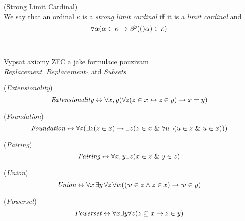 \begin{definition}{(Strong Limit Cardinal)}\label{def:limit_ordinal}\\
We say that an ordinal $\kappa$ is a \emph{strong limit cardinal} iff it is a \emph{limit cardinal} and 
\begin{equation}
\forall \alpha (\alpha \in \kappa \then \power(\alpha) \in \kappa)
\end{equation}
\end{definition}
\

Vypsat axiomy ZFC a jake formulace pouzivam\\
\emph{Replacement}, $Replacement_2$ atd
\emph{Subsets}

\begin{definition}{(\emph{Extensionality})}\label{def:extensionality}\\
\begin{equation}
\emph{Extensionality} \iff \forall x, y(\forall z (z \in x \iff z \in y) \then x = y)
\end{equation}
\end{definition}

\begin{definition}{(\emph{Foundation})}\label{def:foundation}\\
\begin{equation}
\emph{Foundation} \iff \forall x (\exists z (z \in x) \then \exists z (z \in x\ \&\ \forall u \neg (u \in z\ \&\ u \in x)))
\end{equation}
\end{definition}

\begin{definition}{(\emph{Pairing})}\label{def:pairing}\\
\begin{equation}
\emph{Pairing} \iff \forall x, y \exists z (x \in z\ \&\ y \in z)
\end{equation}
\end{definition}

\begin{definition}{(\emph{Union})}\label{def:union}\\
\begin{equation}
\emph{Union} \iff \forall x \,\exists y \, \forall z\, \forall w ((w \in z \land z \in x) \then w \in y)
\end{equation}
\end{definition}

\begin{definition}{(\emph{Powerset})}\label{def:powerset}\\
\begin{equation}
\emph{Powerset} \iff \forall x \exists y \forall z (z \subseteq x \then z \in y)
\end{equation}
\end{definition}

